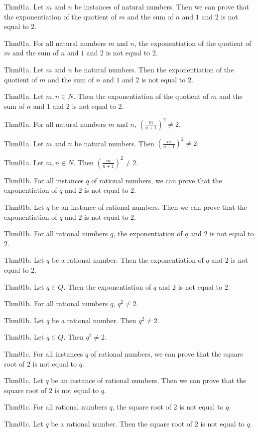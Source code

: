 \documentclass{article}
\begin{document}
Thm01a. Let $m$ and $n$ be instances of natural numbers. Then we can prove that the exponentiation of the quotient of $m$ and the sum of $n$ and $1$ and $2$ is not equal to $2$.

Thm01a. For all natural numbers $m$ and $n$, the exponentiation of the quotient of $m$ and the sum of $n$ and $1$ and $2$ is not equal to $2$.

Thm01a. Let $m$ and $n$ be natural numbers. Then the exponentiation of the quotient of $m$ and the sum of $n$ and $1$ and $2$ is not equal to $2$.

Thm01a. Let $m , n \in N$. Then the exponentiation of the quotient of $m$ and the sum of $n$ and $1$ and $2$ is not equal to $2$.

Thm01a. For all natural numbers $m$ and $n$, ${(\frac{ m }{ n + 1})}^{ 2}\neq 2$.

Thm01a. Let $m$ and $n$ be natural numbers. Then ${(\frac{ m }{ n + 1})}^{ 2}\neq 2$.

Thm01a. Let $m , n \in N$. Then ${(\frac{ m }{ n + 1})}^{ 2}\neq 2$.

Thm01b. For all instances $q$ of rational numbers, we can prove that the exponentiation of $q$ and $2$ is not equal to $2$.

Thm01b. Let $q$ be an instance of rational numbers. Then we can prove that the exponentiation of $q$ and $2$ is not equal to $2$.

Thm01b. For all rational numbers $q$, the exponentiation of $q$ and $2$ is not equal to $2$.

Thm01b. Let $q$ be a rational number. Then the exponentiation of $q$ and $2$ is not equal to $2$.

Thm01b. Let $q \in Q$. Then the exponentiation of $q$ and $2$ is not equal to $2$.

Thm01b. For all rational numbers $q$, ${q }^{ 2}\neq 2$.

Thm01b. Let $q$ be a rational number. Then ${q }^{ 2}\neq 2$.

Thm01b. Let $q \in Q$. Then ${q }^{ 2}\neq 2$.

Thm01c. For all instances $q$ of rational numbers, we can prove that the square root of $2$ is not equal to $q$.

Thm01c. Let $q$ be an instance of rational numbers. Then we can prove that the square root of $2$ is not equal to $q$.

Thm01c. For all rational numbers $q$, the square root of $2$ is not equal to $q$.

Thm01c. Let $q$ be a rational number. Then the square root of $2$ is not equal to $q$.
\end{document}
